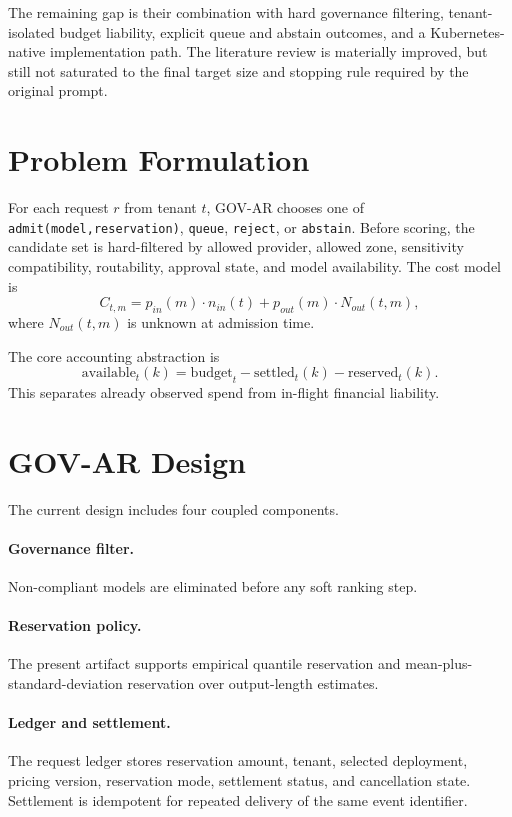 \documentclass[10pt,journal,compsoc]{IEEEtran}
\begin{document}
The remaining gap is their combination with hard governance filtering,
tenant-isolated budget liability, explicit queue and abstain outcomes, and a
Kubernetes-native implementation path. The literature review is materially
improved, but still not saturated to the final target size and stopping rule
required by the original prompt.

\section{Problem Formulation}
For each request $r$ from tenant $t$, GOV-AR chooses one of
\texttt{admit(model,reservation)}, \texttt{queue}, \texttt{reject}, or
\texttt{abstain}. Before scoring, the candidate set is hard-filtered by allowed
provider, allowed zone, sensitivity compatibility, routability, approval state,
and model availability. The cost model is
\[
C_{t,m}=p_{in}(m)\cdot n_{in}(t)+p_{out}(m)\cdot N_{out}(t,m),
\]
where $N_{out}(t,m)$ is unknown at admission time.

The core accounting abstraction is
\[
\mathrm{available}_t(k)=\mathrm{budget}_t-\mathrm{settled}_t(k)-\mathrm{reserved}_t(k).
\]
This separates already observed spend from in-flight financial liability.

\section{GOV-AR Design}
The current design includes four coupled components.

\paragraph{Governance filter.}
Non-compliant models are eliminated before any soft ranking step.

\paragraph{Reservation policy.}
The present artifact supports empirical quantile reservation and mean-plus-
standard-deviation reservation over output-length estimates.

\paragraph{Ledger and settlement.}
The request ledger stores reservation amount, tenant, selected deployment,
pricing version, reservation mode, settlement status, and cancellation state.
Settlement is idempotent for repeated delivery of the same event identifier.
\end{document}

